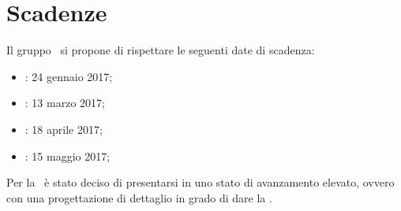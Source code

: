 \newpage
\section{Scadenze}
Il gruppo \gruppo\ si propone di rispettare le seguenti date di scadenza:
\begin{itemize}
	\item \textbf{\RR}: 24 gennaio 2017;
	\item \textbf{\RP}: 13 marzo 2017;
	\item \textbf{\RQ}: 18 aprile 2017;
	\item \textbf{\RA}: 15 maggio 2017;
\end{itemize}
Per la \RP\ è stato deciso di presentarsi in uno stato di avanzamento elevato, ovvero con una progettazione di dettaglio in grado di dare la \DDP.